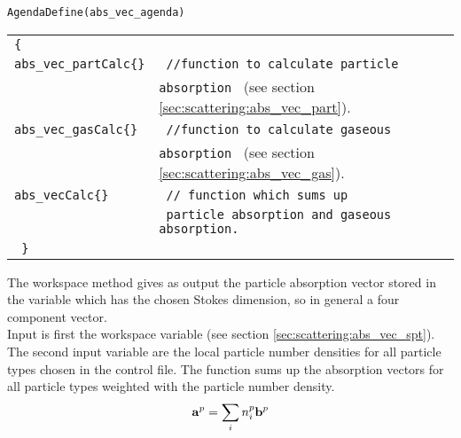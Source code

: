 \verb|AgendaDefine(abs_vec_agenda)|\\
\begin{tabular}[h]{l l}
\verb|{ |\\
\verb|abs_vec_partCalc{}| & \verb| //function to calculate particle |\\
& \verb|absorption | (see section \ref{sec:scattering:abs_vec_part}).\\
\verb|abs_vec_gasCalc{}| & \verb| //function to calculate gaseous | \\
& \verb|absorption | (see section \ref{sec:scattering:abs_vec_gas}).\\ 
\verb|abs_vecCalc{}| &\verb| // function which sums up | \\
& \verb| particle absorption and gaseous absorption.|\\
\verb| }|
\end{tabular}



\label{sec:scattering:abs_vec_part}

The workspace method  gives as output the
particle absorption vector  stored in the variable
 which has the chosen Stokes dimension, so in
general a four component vector.\\
Input is first the workspace variable  (see section
\ref{sec:scattering:abs_vec_spt}). The second input variable are the
local particle number densities  for all particle types
chosen in the control file.
The function sums up the absorption vectors for all particle types
weighted with the particle number density.
\begin{eqnarray}
  {\bf a}^{p} = \sum_i n^p_i {\bf b}^{p}
\end{eqnarray}


\label{sec:scattering:abs_vec_gas}


\label{sec:scattering:abs_vec_spt}

